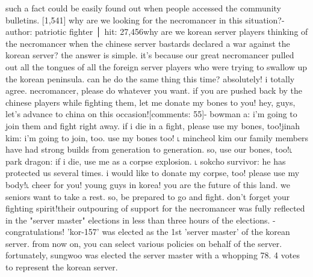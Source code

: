 such a fact could be easily found out when people accessed the community bulletins.
[1,541] why are we looking for the necromancer in this situation?-author: patriotic fighter │ hit: 27,456why are we korean server players thinking of the necromancer when the chinese server bastards declared a war against the korean server? the answer is simple.
 it's because our great necromancer pulled out all the tongues of all the foreign server players who were trying to swallow up the korean peninsula.
 can he do the same thing this time? absolutely! i totally agree.
 necromancer, please do whatever you want.
 if you are pushed back by the chinese players while fighting them, let me donate my bones to you! hey, guys, let's advance to china on this occasion![comments: 55]- bowman a: i'm going to join them and fight right away.
 if i die in a fight, please use my bones, too!jinah kim: i'm going to join, too.
 use my bones too! ˪ mincheol kim our family members have had strong builds from generation to generation.
 so, use our bones, too!˪ park dragon: if i die, use me as a corpse explosion.
 ˪ sokcho survivor: he has protected us several times.
 i would like to donate my corpse, too! please use my body!˪ cheer for you! young guys in korea! you are the future of this land.
 we seniors want to take a rest.
 so, be prepared to go and fight.
 don't forget your fighting spirit!their outpouring of support for the necromancer was fully reflected in the "server master" elections in less than three hours of the elections.
- congratulations! 'kor-157' was elected as the 1st 'server master' of the korean server.
 from now on, you can select various policies on behalf of the server.
fortunately, sungwoo was elected the server master with a whopping 78.
4 votes to represent the korean server.


 